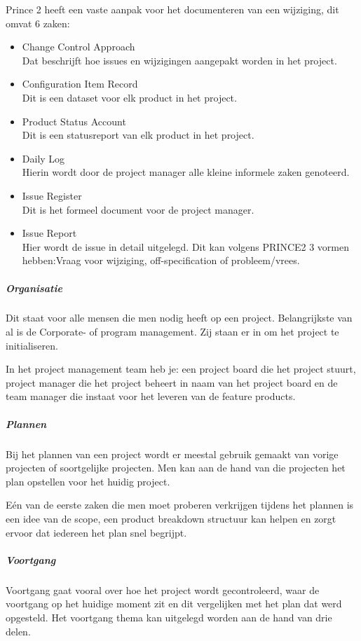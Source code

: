 \documentclass[]{article}
\begin{document}
Prince 2 heeft een vaste aanpak voor het documenteren van een wijziging, dit omvat 6 zaken:
\begin{itemize}
	\item Change Control Approach \\ Dat beschrijft hoe issues en wijzigingen aangepakt worden in het project.
	\item Configuration Item Record \\ Dit is een dataset voor elk product in het project.
	\item Product Status Account \\ Dit is een statusreport van elk product in het project.
	\item Daily Log \\ Hierin wordt door de project manager alle kleine informele zaken genoteerd.
	\item Issue Register \\ Dit is het formeel document voor de project manager.
	\item Issue Report \\ Hier wordt de issue in detail uitgelegd. Dit kan volgens PRINCE2 3 vormen hebben:Vraag voor wijziging, off-specification of probleem/vrees.
\end{itemize}

\subparagraph{Organisatie}
Dit staat voor alle mensen die men nodig heeft op een project. Belangrijkste van al is de Corporate- of program management. Zij staan er in om het project te initialiseren.

In het project management team heb je: een project board die het project stuurt, project manager die het project beheert in naam van het project board en de team manager die instaat voor het leveren van de feature products.

\subparagraph{Plannen}
Bij het plannen van een project wordt er meestal gebruik gemaakt van vorige projecten of soortgelijke projecten. Men kan aan de hand van die projecten het plan opstellen voor het huidig project. 

Eén van de eerste zaken die men moet proberen verkrijgen tijdens het plannen is een idee van de scope, een product breakdown structuur kan helpen en zorgt ervoor dat iedereen het plan snel begrijpt. 

\subparagraph{Voortgang}
Voortgang gaat vooral over hoe het project wordt gecontroleerd, waar de voortgang op het huidige moment zit en dit vergelijken met het plan dat werd opgesteld. Het voortgang thema kan uitgelegd worden aan de hand van drie delen. 
\end{document}
